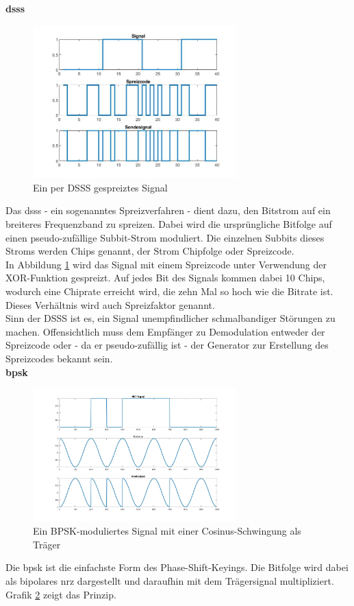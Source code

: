\textbf{\ac{dsss}} \\
\begin{figure}
	\centering
	\includegraphics[width=0.7\textwidth]{Grafiken-Alex/dsss.jpg}
	\caption{Ein per DSSS gespreiztes Signal}
	\label{dsss}
\end{figure}
Das \acf{dsss} - ein sogenanntes Spreizverfahren - dient dazu, den Bitstrom auf ein breiteres Frequenzband zu spreizen. Dabei wird die ursprüngliche Bitfolge auf einen pseudo-zufällige Subbit-Strom moduliert. Die einzelnen Subbits dieses Stroms werden Chips genannt, der Strom Chipfolge oder Spreizcode.\\
In Abbildung \ref{dsss} wird das Signal mit einem Spreizcode unter Verwendung der XOR-Funktion gespreizt. Auf jedes Bit des Signals kommen dabei 10 Chips, wodurch eine Chiprate erreicht wird, die zehn Mal so hoch wie die Bitrate ist. Dieses Verhältnis wird auch Spreizfaktor genannt.\\
Sinn der DSSS ist es, ein Signal unempfindlicher schmalbandiger Störungen zu machen. Offensichtlich muss dem Empfänger zu Demodulation entweder der Spreizcode oder - da er pseudo-zufällig ist - der Generator zur Erstellung des Spreizcodes bekannt sein.\\

\textbf{\ac{bpsk}} \\
\begin{figure}
	\centering
	\includegraphics[width=0.7\textwidth]{Grafiken-Alex/bpsk.jpg}
	\caption{Ein BPSK-moduliertes Signal mit einer Cosinus-Schwingung als Träger}
	\label{bpsk}
\end{figure}
Die \acf{bpsk} ist die einfachste Form des Phase-Shift-Keyings. Die Bitfolge wird dabei als bipolares \ac{nrz} dargestellt und daraufhin mit dem Trägersignal multipliziert. Grafik \ref{bpsk} zeigt das Prinzip. \\

